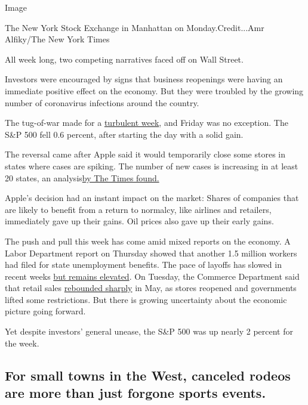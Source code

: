 Image

The New York Stock Exchange in Manhattan on Monday.Credit...Amr
Alfiky/The New York Times

All week long, two competing narratives faced off on Wall Street.

Investors were encouraged by signs that business reopenings were having
an immediate positive effect on the economy. But they were troubled by
the growing number of coronavirus infections around the country.

The tug-of-war made for a
\href{https://www.nytimes.com/2020/06/19/business/economy/theres-probably-never-been-more-uncertainty-fed-official-warns.html}{turbulent
week}, and Friday was no exception. The S\&P 500 fell 0.6 percent, after
starting the day with a solid gain.

The reversal came after Apple said it would temporarily close some
stores in states where cases are spiking. The number of new cases is
increasing in at least 20 states, an
analysis\href{https://www.nytimes.com/interactive/2020/us/coronavirus-us-cases.html}{by
The Times found.}

Apple's decision had an instant impact on the market: Shares of
companies that are likely to benefit from a return to normalcy, like
airlines and retailers, immediately gave up their gains. Oil prices also
gave up their early gains.

The push and pull this week has come amid mixed reports on the economy.
A Labor Department report on Thursday showed that another 1.5 million
workers had filed for state unemployment benefits. The pace of layoffs
has slowed in recent weeks
\href{https://www.nytimes.com/2020/06/18/business/economy/coronavirus-unemployment-claims.html}{but
remains elevated}. On Tuesday, the Commerce Department said that retail
sales
\href{https://www.nytimes.com/2020/06/16/business/may-retail-sales.html}{rebounded
sharply} in May, as stores reopened and governments lifted some
restrictions. But there is growing uncertainty about the economic
picture going forward.

Yet despite investors' general unease, the S\&P 500 was up nearly 2
percent for the week.

\hypertarget{for-small-towns-in-the-west-canceled-rodeos-are-more-than-just-forgone-sports-events}{%
\subsection{For small towns in the West, canceled rodeos are more than
just forgone sports
events.}\label{for-small-towns-in-the-west-canceled-rodeos-are-more-than-just-forgone-sports-events}}


